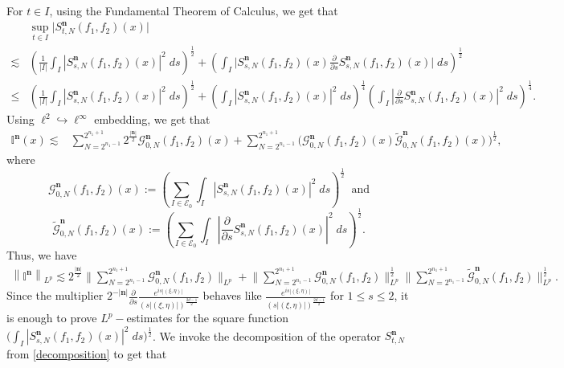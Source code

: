 \documentclass[a4paper,reqno]{amsart}
\numberwithin{equation}{section}
\begin{document}
	For $t\in I$, using the Fundamental Theorem of Calculus, we get that 
	\begin{align}\label{FTC}
		&\sup_{t\in I}\Big|S^{\mathbf{n}}_{t,N}(f_1,f_2)(x) \Big|\\
		\nonumber\lesssim&\left(\frac{1}{|I|}\int_I|S^{\mathbf{n}}_{s,N}(f_1,f_2)(x)|^2\;ds\right)^\frac{1}{2}+\left(\int_I\big|S^{\mathbf{n}}_{s,N}(f_1,f_2)(x)\frac{\partial}{\partial s}S^{\mathbf{n}}_{s,N}(f_1,f_2)(x)\big|\;ds\right)^\frac{1}{2}\\
		\nonumber\leq& \left(\frac{1}{|I|}\int_I|S^{\mathbf{n}}_{s,N}(f_1,f_2)(x)|^2\;ds\right)^\frac{1}{2}+\left(\int_I|S^{\mathbf{n}}_{s,N}(f_1,f_2)(x)|^2\;ds\right)^\frac{1}{4}\left(\int_I\left|\frac{\partial}{\partial s}S^{\mathbf{n}}_{s,N}(f_1,f_2)(x)\right|^2\;ds\right)^\frac{1}{4}.
	\end{align}
	Using $\ell^2\hookrightarrow\ell^\infty$ embedding, we get that 
	\begin{align*}\label{localdeco}
		\mathbb{I}^{\mathbf{n}}(x)\lesssim&\sum_{N=2^{n_1-1}}^{2^{n_1+1}}2^{\frac{|\mathbf{n}|}{2}}\mathcal{G}^{\mathbf{n}}_{0,N}(f_1,f_2)(x)+\sum_{N=2^{n_1-1}}^{2^{n_1+1}}\big(\mathcal{G}^{\mathbf{n}}_{0,N}(f_1,f_2)(x)\tilde{\mathcal{G}}^{\mathbf{n}}_{0,N}(f_1,f_2)(x)\big)^{\frac{1}{2}},
	\end{align*}
	where
	\[\mathcal{G}^{\mathbf{n}}_{0,N}(f_1,f_2)(x):=\left(\sum_{I\in \mathcal{E}_0}\int_I|S^{\mathbf{n}}_{s,N}(f_1,f_2)(x)|^2\;ds\right)^\frac{1}{2}~\text{ and}\]
	\[\tilde{\mathcal{G}}^{\mathbf{n}}_{0,N}(f_1,f_2)(x):=\left(\sum_{I\in \mathcal{E}_0}\int_I\left|\frac{\partial}{\partial s}S^{\mathbf{n}}_{s,N}(f_1,f_2)(x)\right|^2\;ds\right)^\frac{1}{2}.\]    
	Thus, we have 
	\begin{align}\label{MtoG}
		\left\|\mathbb{I}^{\mathbf{n}}\right\|_{L^p}\lesssim2^{\frac{|\mathbf{n}|}{2}}\Bigg\|\sum_{N=2^{n_1-1}}^{2^{n_1+1}}\mathcal{G}^{\mathbf{n}}_{0,N}(f_1,f_2)\Bigg\|_{L^p}+\Bigg\|\sum_{N=2^{n_1-1}}^{2^{n_1+1}}\mathcal{G}^{\mathbf{n}}_{0,N}(f_1,f_2)\Bigg\|_{L^p}^\frac{1}{2}\Bigg\|\sum_{N=2^{n_1-1}}^{2^{n_1+1}}\tilde{\mathcal{G}}^{\mathbf{n}}_{0,N}(f_1,f_2)\Bigg\|_{L^p}^\frac{1}{2}.
	\end{align}
	Since the multiplier $2^{-|\mathbf{n}|}\frac{\partial}{\partial s}\frac{ e^{is|(\xi,\eta)|}}{(s|(\xi,\eta)|)^{\frac{2d-1}{2}}}$ behaves like $\frac{ e^{is|(\xi,\eta)|}}{(s|(\xi,\eta)|)^{\frac{2d-1}{2}}}$ for $1\leq s\leq2$, it is enough to prove $L^p-$estimates for the square function $\Big(\int_I|S^{\mathbf{n}}_{s,N}(f_1,f_2)(x)|^2\;ds\Big)^\frac{1}{2}$. We invoke the decomposition of the operator $S^{\mathbf{n}}_{t,N}$ from \eqref{decomposition} to get that 
\end{document}
